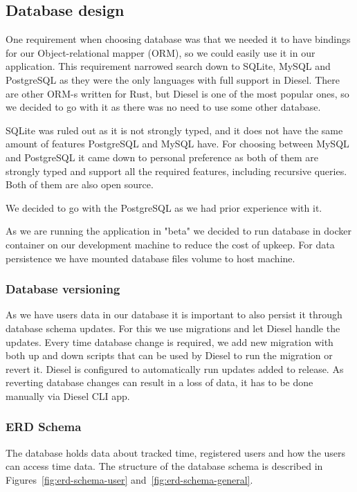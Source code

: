 \subsection{Database design}\label{subsec:database-design}
One requirement when choosing database was that we needed it to have bindings for our Object-relational mapper (ORM),
so we could easily use it in our application.
This requirement narrowed search down to SQLite, MySQL and PostgreSQL as they were the only languages with full support in Diesel.
There are other ORM-s written for Rust, but Diesel is one of the most popular ones, so we decided to go with it as
there was no need to use some other database.

SQLite was ruled out as it is not strongly typed, and it does not have the same amount of features PostgreSQL and MySQL have.
For choosing between MySQL and PostgreSQL it came down to personal preference as both of them are strongly typed and
support all the required features, including recursive queries.
Both of them are also open source.

We decided to go with the PostgreSQL as we had prior experience with it.

As we are running the application in "beta" we decided to run database in docker container on our development machine to
reduce the cost of upkeep.
For data persistence we have mounted database files volume to host machine.

\subsubsection{Database versioning}\label{subsubsec:database-versioning}
As we have users data in our database it is important to also persist it through database schema updates.
For this we use migrations and let Diesel handle the updates.
Every time database change is required, we add new migration with both up and down scripts that can be used by Diesel
to run the migration or revert it.
Diesel is configured to automatically run updates added to release.
As reverting database changes can result in a loss of data, it has to be done manually via Diesel CLI app.

\subsubsection{ERD Schema}\label{subsubsec:erd-schema}
The database holds data about tracked time, registered users and how the users can access time data.
The structure of the database schema is described in Figures~\ref{fig:erd-schema-user} and~\ref{fig:erd-schema-general}.

